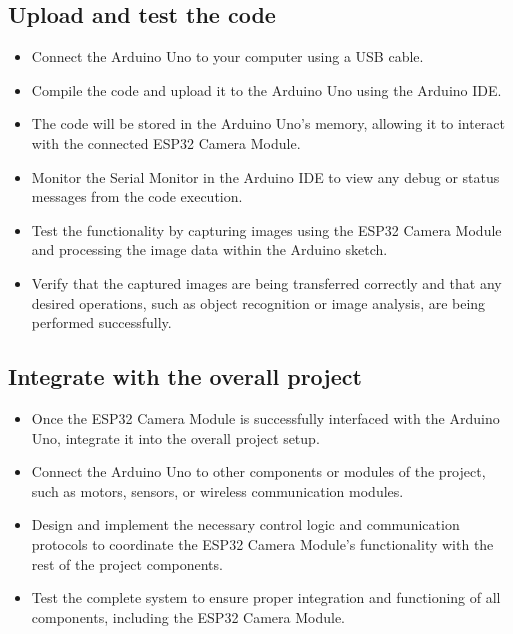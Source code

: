 \documentclass[a4paper,12pt,oneside]{book}
\begin{document}
\begin{enumerate}
\subsection{Upload and test the code}

\begin{itemize}
  \item Connect the Arduino Uno to your computer using a USB cable.
  \item Compile the code and upload it to the Arduino Uno using the Arduino IDE.
  \item The code will be stored in the Arduino Uno's memory, allowing it to interact with the connected ESP32 Camera Module.
  \item Monitor the Serial Monitor in the Arduino IDE to view any debug or status messages from the code execution.
  \item Test the functionality by capturing images using the ESP32 Camera Module and processing the image data within the Arduino sketch.
  \item Verify that the captured images are being transferred correctly and that any desired operations, such as object recognition or image analysis, are being performed successfully.
\end{itemize}

\subsection{Integrate with the overall project}

\begin{itemize}
  \item Once the ESP32 Camera Module is successfully interfaced with the Arduino Uno, integrate it into the overall project setup.
  \item Connect the Arduino Uno to other components or modules of the project, such as motors, sensors, or wireless communication modules.
  \item Design and implement the necessary control logic and communication protocols to coordinate the ESP32 Camera Module's functionality with the rest of the project components.
  \item Test the complete system to ensure proper integration and functioning of all components, including the ESP32 Camera Module.
\end{itemize}

\end{enumerate}
\end{document}
